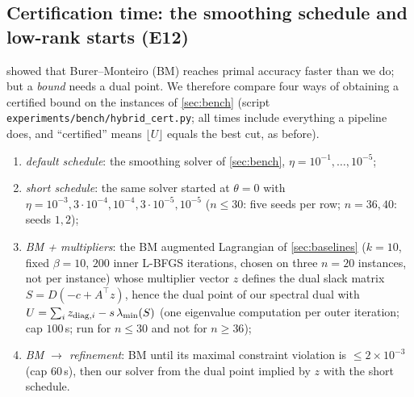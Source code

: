 \documentclass[a4paper,11pt]{article}
\newcommand{\fitbox}[1]{\sbox{\tabbox}{#1}\ifdim\wd\tabbox>\textwidth\resizebox{\textwidth}{!}{\usebox{\tabbox}}\else\usebox{\tabbox}\fi}
\theoremstyle{plain}
\theoremstyle{definition}
\theoremstyle{remark}
\newcommand{\lmin}{\lambda_{\min}}
\begin{document}
\subsection{Certification time: the smoothing schedule and low-rank starts (E12)}\label{sec:e12}
 showed that Burer--Monteiro (BM) reaches primal accuracy faster than we do; but a \emph{bound} needs a dual point. We therefore compare four ways of obtaining a certified bound on the instances of \cref{sec:bench} (script \texttt{experiments/bench/hybrid\_cert.py}; all times include everything a pipeline does, and ``certified'' means $\lfloor U\rfloor$ equals the best cut, as before).
\begin{enumerate}[label=(\roman*),leftmargin=2em,nosep]
\item \emph{default schedule}: the smoothing solver of \cref{sec:bench}, $\eta=10^{-1},\dots,10^{-5}$;
\item \emph{short schedule}: the same solver started at $\theta=0$ with $\eta=10^{-3},3\cdot10^{-4},10^{-4},3\cdot10^{-5},10^{-5}$ ($n\le30$: five seeds per row; $n=36,40$: seeds $1,2$);
\item \emph{BM + multipliers}: the BM augmented Lagrangian of \cref{sec:baselines} ($k=10$, fixed $\beta=10$, $200$ inner L-BFGS iterations, chosen on three $n=20$ instances, not per instance) whose multiplier vector $z$ defines the dual slack matrix $S=D(-c+A^\top z)$, hence the dual point of our spectral dual with $U=\sum_iz_{{\rm diag},i}-s\,\lmin(S)$ (one eigenvalue computation per outer iteration; cap $100$\,s; run for $n\le30$ and not for $n\ge36$);
\item \emph{BM $\to$ refinement}: BM until its maximal constraint violation is $\le2\times10^{-3}$ (cap $60$\,s), then our solver from the dual point implied by $z$ with the short schedule.
\end{enumerate}
\begin{table}[t]\centering\scriptsize
\setlength{\tabcolsep}{3pt}
\fitbox{}
\caption{Median time (s) to a certified optimal cut, with (certified runs / runs) in parentheses; ``--'' without parentheses: not run. The last column is the median time spent in the BM phase of (iv). The \texttt{reg3} rows are random $3$-regular graphs (five instances at $n=50$, three at $n=60$); their default-schedule entry is the single seed-$1$ instance of \cref{tab:e3}.}\label{tab:e12}
\end{table}
\end{document}
